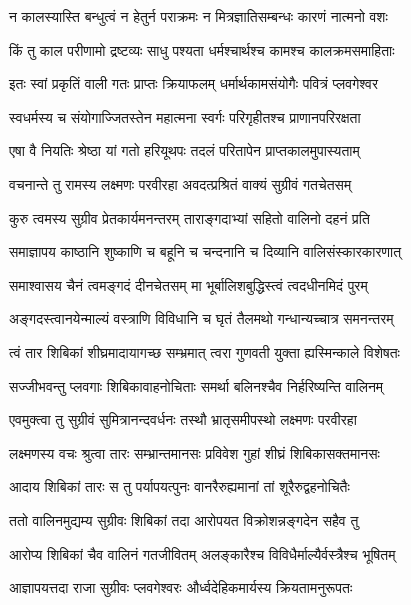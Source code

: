 \twolineshloka
{न कालस्यास्ति बन्धुत्वं न हेतुर्न पराक्रमः}
{न मित्रज्ञातिसम्बन्धः कारणं नात्मनो वशः} %

\twolineshloka
{किं तु काल परीणामो द्रष्टव्यः साधु पश्यता}
{धर्मश्चार्थश्च कामश्च कालक्रमसमाहिताः} %

\twolineshloka
{इतः स्वां प्रकृतिं वाली गतः प्राप्तः क्रियाफलम्}
{धर्मार्थकामसंयोगैः पवित्रं प्लवगेश्वर} %

\twolineshloka
{स्वधर्मस्य च संयोगाज्जितस्तेन महात्मना}
{स्वर्गः परिगृहीतश्च प्राणानपरिरक्षता} %

\twolineshloka
{एषा वै नियतिः श्रेष्ठा यां गतो हरियूथपः}
{तदलं परितापेन प्राप्तकालमुपास्यताम्} %

\twolineshloka
{वचनान्ते तु रामस्य लक्ष्मणः परवीरहा}
{अवदत्प्रश्रितं वाक्यं सुग्रीवं गतचेतसम्} %

\twolineshloka
{कुरु त्वमस्य सुग्रीव प्रेतकार्यमनन्तरम्}
{ताराङ्गदाभ्यां सहितो वालिनो दहनं प्रति} %

\twolineshloka
{समाज्ञापय काष्ठानि शुष्काणि च बहूनि च}
{चन्दनानि च दिव्यानि वालिसंस्कारकारणात्} %

\twolineshloka
{समाश्वासय चैनं त्वमङ्गदं दीनचेतसम्}
{मा भूर्बालिशबुद्धिस्त्वं त्वदधीनमिदं पुरम्} %

\twolineshloka
{अङ्गदस्त्वानयेन्माल्यं वस्त्राणि विविधानि च}
{घृतं तैलमथो गन्धान्यच्चात्र समनन्तरम्} %

\twolineshloka
{त्वं तार शिबिकां शीघ्रमादायागच्छ सम्भ्रमात्}
{त्वरा गुणवती युक्ता ह्यस्मिन्काले विशेषतः} %

\twolineshloka
{सज्जीभवन्तु प्लवगाः शिबिकावाहनोचिताः}
{समर्था बलिनश्चैव निर्हरिष्यन्ति वालिनम्} %

\twolineshloka
{एवमुक्त्वा तु सुग्रीवं सुमित्रानन्दवर्धनः}
{तस्थौ भ्रातृसमीपस्थो लक्ष्मणः परवीरहा} %

\twolineshloka
{लक्ष्मणस्य वचः श्रुत्वा तारः सम्भ्रान्तमानसः}
{प्रविवेश गुहां शीघ्रं शिबिकासक्तमानसः} %

\twolineshloka
{आदाय शिबिकां तारः स तु पर्यापयत्पुनः}
{वानरैरुह्यमानां तां शूरैरुद्वहनोचितैः} %

\twolineshloka
{ततो वालिनमुद्यम्य सुग्रीवः शिबिकां तदा}
{आरोपयत विक्रोशन्नङ्गदेन सहैव तु} %

\twolineshloka
{आरोप्य शिबिकां चैव वालिनं गतजीवितम्}
{अलङ्कारैश्च विविधैर्माल्यैर्वस्त्रैश्च भूषितम्} %

\twolineshloka
{आज्ञापयत्तदा राजा सुग्रीवः प्लवगेश्वरः}
{और्ध्वदेहिकमार्यस्य क्रियतामनुरूपतः} %

